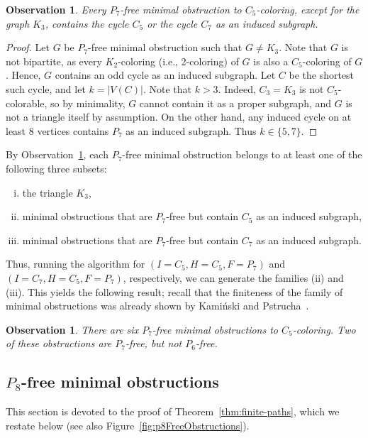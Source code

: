 \documentclass[11pt,a4paper]{article}
\theoremstyle{mystyle}
\newtheorem{observation}[theorem]{Observation}
\begin{document}
\begin{observation}\label{obs:p7start}
Every $P_7$-free minimal obstruction to $C_5$-coloring, except for the graph $K_3$, contains the cycle $C_5$ or the cycle $C_7$ as an induced subgraph.
\end{observation}
\begin{proof}
Let $G$ be $P_7$-free minimal obstruction such that $G \neq K_3$.
Note that $G$ is not bipartite, as every $K_2$-coloring (i.e., 2-coloring) of $G$ is also a $C_5$-coloring of $G$.
Hence, $G$ contains an odd cycle as an induced subgraph. Let $C$ be the shortest such cycle, and let $k = |V(C)|$.
Note that $k > 3$. Indeed, $C_3 = K_3$ is not $C_5$-colorable, so by minimality, $G$ cannot contain it as a proper subgraph, and $G$ is not a triangle itself by assumption.
On the other hand, any induced cycle on at least $8$ vertices contains $P_7$ as an induced subgraph.
Thus $k \in \{5,7\}$.
\end{proof}

By Observation~\ref{obs:p7start}, each $P_7$-free minimal obstruction belongs to at least one of the following three subsets:
\begin{enumerate}[(i)]
    \item the triangle $K_3$,
    \item minimal obstructions that are $P_7$-free but contain $C_5$ as an induced subgraph,
    \item minimal obstructions that are $P_7$-free but contain $C_7$ as an induced subgraph.
\end{enumerate}
Thus, running the algorithm for $(I=C_5,H=C_5,F=P_7)$ and $(I=C_7,H=C_5,F=P_7)$, respectively, we can generate the families (ii) and (iii). This yields the following result; recall that the finiteness of the family of minimal obstructions was already shown by Kami\'{n}ski and Pstrucha~\cite{DBLP:journals/dam/KaminskiP19}.

\begin{observation}
There are six $P_7$-free minimal obstructions to $C_5$-coloring.
Two of these obstructions are $P_7$-free, but not $P_6$-free.
\end{observation}

\subsection{$P_8$-free minimal obstructions}

This section is devoted to the proof of Theorem~\ref{thm:finite-paths}, which we restate below (see also Figure~\ref{fig:p8FreeObstructions}).
\end{document}

